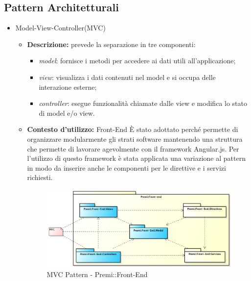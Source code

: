 \subsection{Pattern Architetturali}
\begin{itemize}
	\item Model-View-Controller(\gls{MVC})
	\begin{itemize}
		\item \textbf{Descrizione:} prevede la separazione in tre componenti:
		\begin{itemize}
			\item \textit{model}: fornisce i metodi per accedere ai dati utili all'applicazione;
			\item \textit{view}:  visualizza i dati contenuti nel model e si occupa delle interazione esterne;
			\item \textit{controller}: esegue funzionalità chiamate dalle view e modifica lo stato di model e/o view.
		\end{itemize}
		\item \textbf{Contesto d'utilizzo:} \gls{Front-End} \newline È stato adottato perché permette di organizzare modularmente gli strati software mantenendo una struttura che permette di lavorare agevolmente con il \gls{framework} \gls{Angular}.js. Per l'utilizzo di questo framework è stata applicata una variazione al pattern in modo da inserire anche le componenti per le direttive e i servizi richiesti.
		\begin{figure}[h]
			\centering
			\includegraphics[width=\linewidth]{img/front-end_mvc}
			\caption[MVC Pattern - Premi::Front-End]{MVC Pattern - Premi::Front-End}
		\end{figure}
	\end{itemize}
\end{itemize}

\newpage

